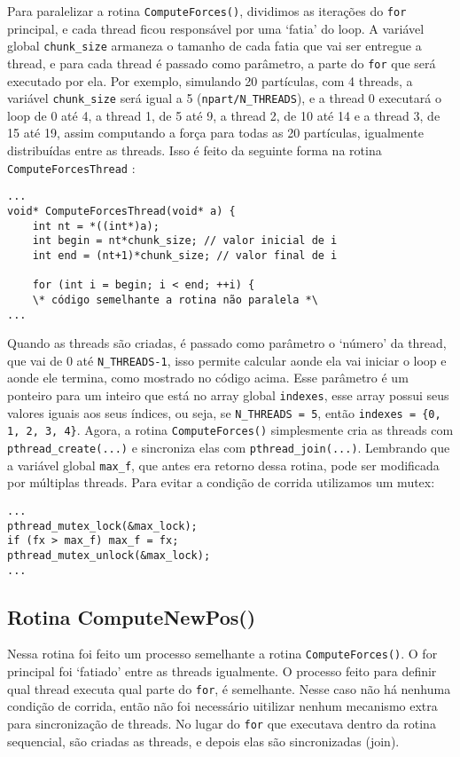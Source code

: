 \documentclass[a4paper, 12pt]{article}
\begin{document}
Para paralelizar a rotina \verb|ComputeForces()|, dividimos as iterações do
\verb|for| principal, e cada thread ficou responsável por uma `fatia' do loop.
A variável global \verb|chunk_size| armaneza o tamanho de cada fatia que vai ser
entregue a thread, e para cada thread é passado como parâmetro, a parte do
\verb|for| que será executado por ela. Por exemplo, simulando 20 partículas, com
4 threads, a variável \verb|chunk_size| será igual a 5 (\verb|npart/N_THREADS|),
e a thread 0 executará o loop de 0 até 4, a thread 1, de 5 até 9, a thread 2, de
10 até 14 e a thread 3, de 15 até 19, assim computando a força para todas as 20
partículas, igualmente distribuídas entre as threads. Isso é feito da seguinte
forma na rotina \verb|ComputeForcesThread| :
\begin{verbatim}
...
void* ComputeForcesThread(void* a) {
    int nt = *((int*)a);
    int begin = nt*chunk_size; // valor inicial de i
    int end = (nt+1)*chunk_size; // valor final de i

    for (int i = begin; i < end; ++i) {
    \* código semelhante a rotina não paralela *\
...
\end{verbatim}
Quando as threads são criadas, é passado como parâmetro o `número' da thread,
que vai de 0 até \verb|N_THREADS-1|, isso permite calcular aonde ela vai iniciar
o loop e aonde ele termina, como mostrado no código acima. Esse parâmetro é um
ponteiro para um inteiro que está no array global \verb|indexes|, esse array
possui seus valores iguais aos seus índices, ou seja, se \verb|N_THREADS = 5|,
então \verb|indexes = {0, 1, 2, 3, 4}|.
Agora, a rotina \verb|ComputeForces()| simplesmente cria as threads com
\verb|pthread_create(...)| e sincroniza elas com \verb|pthread_join(...)|.
Lembrando que a variável global \verb|max_f|, que antes era retorno dessa
rotina, pode ser modificada por múltiplas threads. Para evitar a condição de
corrida utilizamos um mutex:
\begin{verbatim}
...
pthread_mutex_lock(&max_lock);
if (fx > max_f) max_f = fx;
pthread_mutex_unlock(&max_lock);
...
\end{verbatim}


\subsection{Rotina ComputeNewPos()}

Nessa rotina foi feito um processo semelhante a rotina \verb|ComputeForces()|. O
for principal foi `fatiado' entre as threads igualmente. O processo feito para
definir qual thread executa qual parte do \verb|for|, é semelhante. Nesse caso
não há nenhuma condição de corrida, então não foi necessário uitilizar nenhum
mecanismo extra para sincronização de threads. No lugar do \verb|for| que
executava dentro da rotina sequencial, são criadas as threads, e depois elas são
sincronizadas (join).
\end{document}
